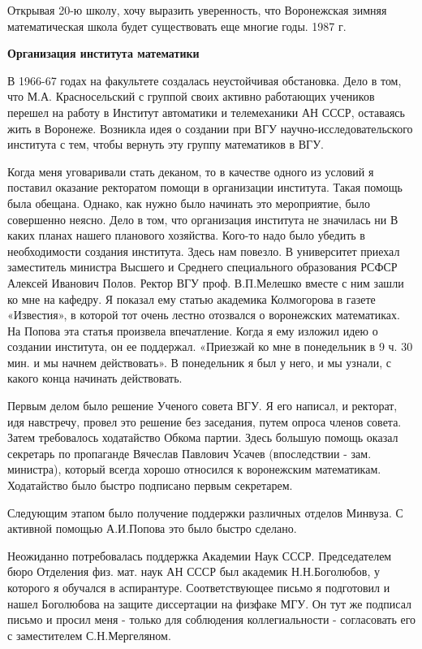 Открывая 20-ю школу, хочу выразить уверенность, что Воронежская зимняя математическая школа будет существовать еще многие годы.
1987 г.

{\bf Организация института математики}

В 1966-67 годах на факультете создалась неустойчивая обстановка. Дело в том, что М.А. Красносельский с группой своих активно работающих учеников перешел на работу в Институт автоматики и телемеханики АН СССР, оставаясь жить в Воронеже. Возникла идея о создании при ВГУ научно-исследовательского института с тем, чтобы вернуть эту группу математиков в ВГУ.

Когда меня уговаривали стать деканом, то в качестве одного из условий я
поставил оказание ректоратом помощи в организации института. Такая помощь была обещана. Однако, как нужно было начинать это мероприятие, было совершенно неясно. Дело в том, что организация института не значилась ни В каких планах нашего планового хозяйства. Кого-то надо было убедить в необходимости создания института. Здесь нам повезло. В университет приехал заместитель министра Высшего и Среднего специального образования РСФСР Алексей Иванович Полов. Ректор ВГУ проф. В.П.Мелешко вместе с ним зашли ко мне на кафедру. Я показал ему статью академика Колмогорова в газете «Известия», в которой тот очень лестно отозвался о воронежских математиках. На Попова эта статья произвела впечатление. Когда я ему изложил идею о создании института, он ее поддержал. «Приезжай ко мне в понедельник в 9 ч. 30 мин. и мы начнем действовать». В понедельник я был у него, и мы узнали, с какого конца начинать действовать.

Первым делом было решение Ученого совета ВГУ. Я его написал, и ректорат, идя навстречу, провел это решение без заседания, путем опроса членов совета. Затем требовалось ходатайство Обкома партии. Здесь большую помощь оказал секретарь по пропаганде Вячеслав Павлович Усачев (впоследствии - зам. министра), который всегда хорошо относился к воронежским математикам. Ходатайство было быстро подписано первым секретарем.

Следующим этапом было получение поддержки различных отделов Минвуза. С активной помощью А.И.Попова это было быстро сделано.

Неожиданно потребовалась поддержка Академии Наук СССР. Председателем бюро Отделения физ. мат. наук АН СССР был академик Н.Н.Боголюбов, у которого я обучался в аспирантуре. Соответствующее письмо я подготовил и нашел Боголюбова на защите диссертации на физфаке МГУ. Он тут же подписал письмо и просил меня - только для соблюдения коллегиальности - согласовать его с заместителем С.Н.Мергеляном.

